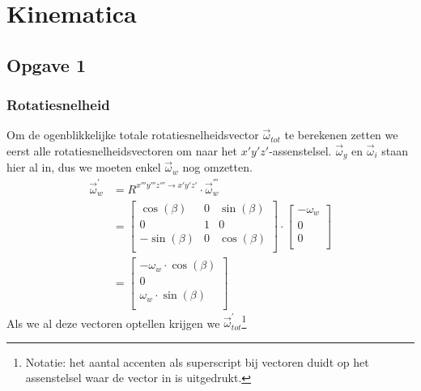 \section{Kinematica}
\subsection{Opgave 1}
\subsubsection{Rotatiesnelheid}
Om de ogenblikkelijke totale rotatiesnelheidsvector $\vec{\omega}_{tot}$ te berekenen zetten we eerst alle rotatiesnelheidsvectoren om naar het $x'y'z'$-assenstelsel. $\vec{\omega}_{g}$ en $\vec{\omega}_{i}$ staan hier al in, dus we moeten enkel $\vec{\omega}_{w}$ nog omzetten. 
\begin{equation}
\begin{split}
\vec{\omega}_{w}^{'}&=R^{x'''y'''z''' \rightarrow x'y'z'} \cdot \vec{\omega}_{w}^{'''}\\
&=\begin{bmatrix}
\cos(\beta)	&			0			&\sin(\beta)\\
0						&			1			&			0		 \\
-\sin(\beta)&			0			&\cos(\beta)\\
\end{bmatrix}
\cdot
\begin{bmatrix}
-\omega_{w}	\\
0						\\
0						\\
\end{bmatrix}\\
&=
\begin{bmatrix}
-\omega_{w}\cdot \cos(\beta)	\\
0						\\
\omega_{w}\cdot \sin(\beta)	\\
\end{bmatrix}
\end{split}
\label{eq:kin1.1}
\end{equation}
Als we al deze vectoren optellen krijgen we $\vec{\omega}_{tot}^{'}$\footnote{Notatie: het aantal accenten als superscript bij vectoren duidt op het assenstelsel waar de vector in is uitgedrukt.}
